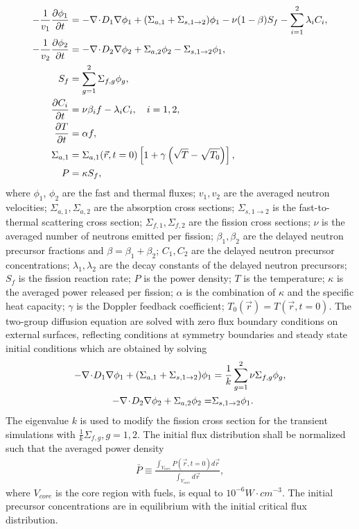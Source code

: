 \begin{subequations}
\begin{align}
-\frac{1}{v_1} \frac{\partial \phi_1}{\partial t} &= -\mathbf{\nabla}\! \cdot \! D_1 \mathbf{\nabla}\phi_1 + (\Sigma_{a,1} + \Sigma_{s, 1\rightarrow 2})\phi_1 - \nu(1-\beta)S_f  - \sum_{i=1}^2 \lambda_i C_i, \\
-\frac{1}{v_2} \frac{\partial \phi_2}{\partial t} &= -\mathbf{\nabla}\! \cdot \! D_2 \mathbf{\nabla}\phi_2 + \Sigma_{a,2}\phi_2 - \Sigma_{s, 1\rightarrow 2}\phi_1, \\
S_f &= \sum_{g=1}^2 \Sigma_{f,g} \phi_g, \\
\frac{\partial C_i}{\partial t} &= \nu\beta_i f - \lambda_i C_i, \quad i=1,2, \\
\frac{\partial T}{\partial t} &= \alpha f, \label{eq:lra-temp} \\
\Sigma_{a,1} &= \Sigma_{a,1}(\vec{r}, t=0) \left[1+\gamma\left(\sqrt{T} - \sqrt{T_0}\right)\right], \\
P &= \kappa S_f,
\end{align}
\end{subequations}
where $\phi_1$, $\phi_2$ are the fast and thermal fluxes; $v_1, v_2$ are the averaged neutron velocities; $\Sigma_{a,1}, \Sigma_{a,2}$ are the absorption cross sections; $\Sigma_{s,1\rightarrow 2}$ is the fast-to-thermal scattering cross section; $\Sigma_{f,1}, \Sigma_{f,2}$ are the fission cross sections; $\nu$ is the averaged number of neutrons emitted per fission; $\beta_1, \beta_2$ are the delayed neutron precursor fractions and $\beta=\beta_1 + \beta_2$; $C_1, C_2$ are the delayed neutron precursor concentrations; $\lambda_1, \lambda_2$ are the decay constants of the delayed neutron precursors; $S_f$ is the fission reaction rate; $P$ is the power density; $T$ is the temperature; $\kappa$ is the averaged power released per fission; $\alpha$ is the combination of $\kappa$ and the specific heat capacity; $\gamma$ is the Doppler feedback coefficient; $T_0(\vec{r})=T(\vec{r}, t=0)$.
The two-group diffusion equation are solved with zero flux boundary conditions on external surfaces, reflecting conditions at symmetry boundaries and steady state initial conditions which are obtained by solving
\begin{align}
-\mathbf{\nabla}\! \cdot \! D_1 \mathbf{\nabla}\phi_1 + (\Sigma_{a,1} + \Sigma_{s, 1\rightarrow 2})\phi_1 &= \frac{1}{k}\sum_{g=1}^2 \nu\Sigma_{f,g}\phi_g, \\
-\mathbf{\nabla}\! \cdot \! D_2 \mathbf{\nabla}\phi_2 + \Sigma_{a,2}\phi_2 =& \Sigma_{s, 1\rightarrow 2}\phi_1.
\end{align}
The eigenvalue $k$ is used to modify the fission cross section for the transient simulations with $\frac{1}{k}\Sigma_{f,g}, g=1,2$.  The initial flux distribution shall be normalized such that the averaged power density
\begin{align}
\bar{P} \equiv \frac{\int_{V_{core}} P(\vec{r}, t=0) d\vec{r}}{\int_{V_{core}} d\vec{r}},
\end{align}
where $V_{core}$ is the core region with fuels, is equal to $10^{-6} W\cdot cm^{-3}$.
The initial precursor concentrations are in equilibrium with the initial critical flux distribution.

